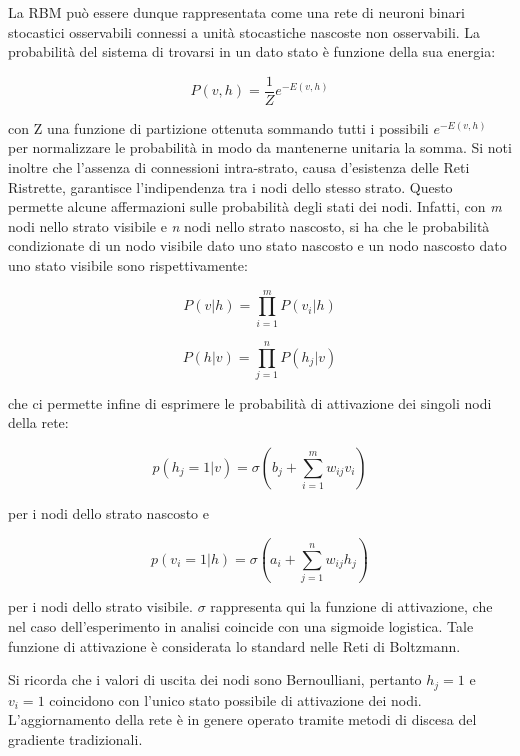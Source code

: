 \documentclass[10pt,letterpaper]{article}
\begin{document}
La RBM può essere dunque rappresentata come una rete di neuroni binari stocastici osservabili connessi a unità stocastiche nascoste non osservabili. La probabilità del sistema di trovarsi in un dato stato è funzione della sua energia:

\begin{equation}
P(v,h) = \frac{1}{Z} e^{-E(v,h)}
\end{equation}

con Z una funzione di partizione ottenuta sommando tutti i possibili $e^{-E(v,h)}$ per normalizzare le probabilità in modo da mantenerne unitaria la somma. Si noti inoltre che l'assenza di connessioni intra-strato, causa d'esistenza delle Reti Ristrette, garantisce l'indipendenza tra i nodi dello stesso strato. Questo permette alcune affermazioni sulle probabilità degli stati dei nodi. Infatti, con \textit{m} nodi nello strato visibile e \textit{n} nodi nello strato nascosto, si ha che le probabilità condizionate di un nodo visibile dato uno stato nascosto e un nodo nascosto dato uno stato visibile sono rispettivamente:

\begin{equation}
P(v|h) = \prod_{i=1}^{m}P(v_i|h)
\end{equation}

\begin{equation}
P(h|v) = \prod_{j=1}^{n}P(h_j|v)
\end{equation}

che ci permette infine di esprimere le probabilità di attivazione dei singoli nodi della rete:

\begin{equation}
p(h_j = 1|v) = \sigma(b_j + \sum_{i=1}^{m}w_{ij}v_i) 
\end{equation}

per i nodi dello strato nascosto e

\begin{equation}
p(v_i = 1|h) = \sigma(a_i + \sum_{j=1}^{n}w_{ij}h_j)
\end{equation}

per i nodi dello strato visibile. $\sigma$ rappresenta qui la funzione di attivazione, che nel caso dell'esperimento in analisi coincide con una sigmoide logistica. Tale funzione di attivazione è considerata lo standard nelle Reti di Boltzmann.

Si ricorda che i valori di uscita dei nodi sono Bernoulliani, pertanto $h_j = 1$ e $v_i = 1$ coincidono con l'unico stato possibile di attivazione dei nodi. L'aggiornamento della rete è in genere operato tramite metodi di discesa del gradiente tradizionali.
\end{document}
